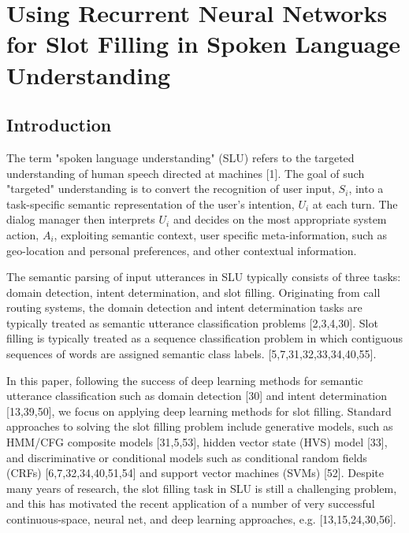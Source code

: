 \chapter{Using Recurrent Neural Networks for Slot Filling in Spoken Language Understanding}
\label{chap:rnn}

\section{Introduction}

The term "spoken language understanding" (SLU) refers to the targeted
understanding of human speech directed at machines [1]. The goal of such
"targeted" understanding is to convert the recognition of user input, $S_i$, into
a task-specific semantic representation of the user's intention, $U_i$ at each
turn. The dialog manager then interprets $U_i$ and decides on the most
appropriate system action, $A_i$, exploiting semantic context, user specific
meta-information, such as geo-location and personal preferences, and other
contextual information.

The semantic parsing of input utterances in SLU typically consists of three
tasks: domain detection, intent determination, and slot filling. Originating
from call routing systems, the domain detection and intent determination tasks
are typically treated as semantic utterance classification problems [2,3,4,30].
Slot filling is typically treated as a sequence classification problem in which
contiguous sequences of words are assigned semantic class labels.
[5,7,31,32,33,34,40,55]. 

In this paper, following the success of deep learning methods for semantic
utterance classification such as domain detection [30] and intent determination
[13,39,50], we focus on applying deep learning methods for slot filling.
Standard approaches to solving the slot filling problem include generative
models, such as HMM/CFG composite models [31,5,53], hidden vector state (HVS)
model [33], and discriminative or conditional models such as conditional random
fields (CRFs) [6,7,32,34,40,51,54] and support vector machines (SVMs) [52].
Despite many years of research, the slot filling task in SLU is still a
challenging problem, and this has motivated the recent application of a number
of very successful continuous-space, neural net, and deep learning approaches,
e.g. [13,15,24,30,56]. 

